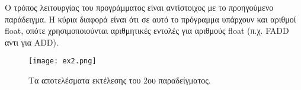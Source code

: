 \documentclass[12pt,a4paper]{report}
\begin{document}
\par Ο τρόπος λειτουργίας του προγράμματος είναι αντίστοιχος 
με το προηγούμενο παράδειγμα. Η κύρια διαφορά είναι ότι σε 
αυτό το πρόγραμμα υπάρχουν και αριθμοί float, οπότε χρησιμοποιούνται 
αριθμητικές εντολές για αριθμούς float (π.χ. FADD αντι για ADD).
\\
\begin{figure}[h]
    \texttt{[image: ex2.png]}
    \caption{Τα αποτελέσματα εκτέλεσης του 2ου παραδείγματος.}
\end{figure}
\end{document}
